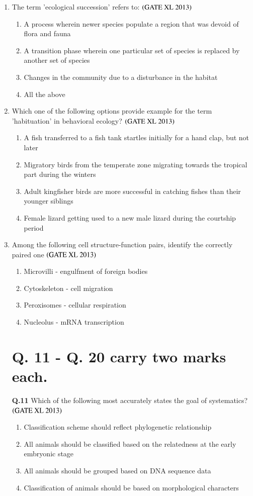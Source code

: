\documentclass[journal]{IEEEtran}
\begin{document}
\begin{enumerate}
\item The term 'ecological succession' refers to: \hfill $\left(\text{GATE XL 2013}\right)$
\begin{enumerate}
    \item A process wherein newer species populate a region that was devoid of flora and fauna
    \item A transition phase wherein one particular set of species is replaced by another set of species
    \item Changes in the community due to a disturbance in the habitat
    \item All the above
\end{enumerate}

\item Which one of the following options provide example for the term 'habituation' in behavioral ecology? \hfill $\left(\text{GATE XL 2013}\right)$
\begin{enumerate}
    \item A fish transferred to a fish tank startles initially for a hand clap, but not later
    \item Migratory birds from the temperate zone migrating towards the tropical part during the winters
    \item Adult kingfisher birds are more successful in catching fishes than their younger siblings
    \item Female lizard getting used to a new male lizard during the courtship period
\end{enumerate}

\item Among the following cell structure-function pairs, identify the correctly paired one \hfill $\left(\text{GATE XL 2013}\right)$
\begin{enumerate}
    \item Microvilli - engulfment of foreign bodies
    \item Cytoskeleton - cell migration
    \item Peroxisomes - cellular respiration
    \item Nucleolus - mRNA transcription
\end{enumerate}

\section*{Q. 11 - Q. 20 carry two marks each.}

\textbf{Q.11} Which of the following most accurately states the goal of systematics? \hfill $\left(\text{GATE XL 2013}\right)$
\begin{enumerate}
    \item Classification scheme should reflect phylogenetic relationship
    \item All animals should be classified based on the relatedness at the early embryonic stage
    \item All animals should be grouped based on DNA sequence data
    \item Classification of animals should be based on morphological characters
\end{enumerate}


\end{enumerate}
\end{document}
